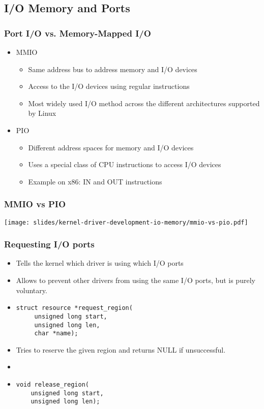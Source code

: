 \subsection{I/O Memory and Ports}

\begin{frame}
  \frametitle{Port I/O vs. Memory-Mapped I/O}
  \begin{itemize}
  \item MMIO
    \begin{itemize}
    \item Same address bus to address memory and I/O devices
    \item Access to the I/O devices using regular instructions
    \item Most widely used I/O method across the different
      architectures supported by Linux
    \end{itemize}
  \item PIO
    \begin{itemize}
    \item Different address spaces for memory and I/O devices
    \item Uses a special class of CPU instructions to access I/O
      devices
    \item Example on x86: IN and OUT instructions
    \end{itemize}
  \end{itemize}
\end{frame}

\begin{frame}
  \frametitle{MMIO vs PIO}
  \begin{center}
    \texttt{[image: slides/kernel-driver-development-io-memory/mmio-vs-pio.pdf]}
  \end{center}
\end{frame}

\begin{frame}[fragile]
  \frametitle{Requesting I/O ports}
  \begin{itemize}
  \item Tells the kernel which driver is using which I/O ports
  \item Allows to prevent other drivers from using the same I/O ports,
    but is purely voluntary.
  \item
\begin{verbatim}
struct resource *request_region(
     unsigned long start,
     unsigned long len,
     char *name);
\end{verbatim}
  \item Tries to reserve the given region and returns NULL if unsuccessful.
  \item {}
  \item
\begin{verbatim}
void release_region(
    unsigned long start,
    unsigned long len);
\end{verbatim}
\end{itemize}
\end{frame}

